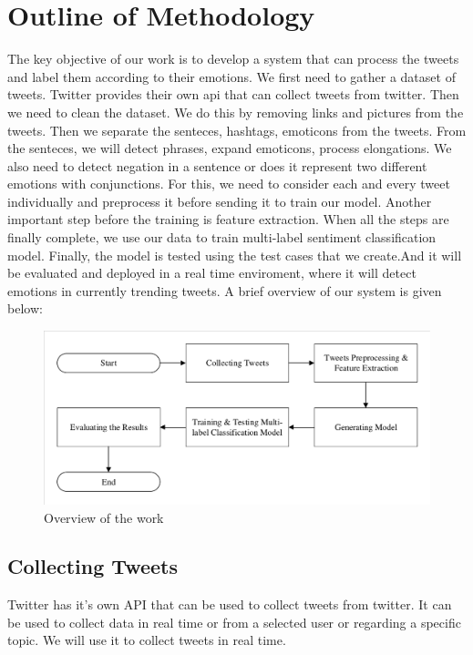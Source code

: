 \documentclass[12pt,a4paper]{article}
\begin{document}
\section{Outline of Methodology}
\par \noindent  The key objective of our work is to develop a system that can process the tweets and label them according to their emotions. We first need to gather a dataset of tweets. Twitter provides their own api that can collect tweets from twitter. Then we need to clean the dataset. We do this by removing links and pictures from the tweets. Then we separate the senteces, hashtags, emoticons from the tweets. From the senteces, we will detect phrases, expand emoticons, process elongations. We also need to detect negation in a sentence or does it represent two different emotions with conjunctions.  For this, we need to consider each and every tweet individually and preprocess it before sending it to train our model. Another important step before the training is feature extraction. When all the steps are finally complete, we use our data to train multi-label sentiment classification model. Finally, the model is tested using the test cases that we create.And it will be evaluated and deployed in a real time enviroment, where it will detect emotions in currently trending tweets. A brief overview of our system is given below:
\begin{figure}[H]
	\centering
	\includegraphics[scale=0.8]{1-1.pdf} \qquad
	\caption{Overview of the work}
	\label{1}
\end{figure}
\subsection*{Collecting Tweets}
Twitter has it's own API that can be used to collect tweets from twitter. It can be used to collect data in real time or from a selected user or regarding a specific topic. We will use it to collect tweets in real time.
\end{document}
